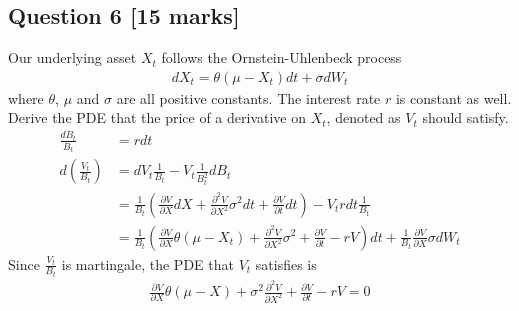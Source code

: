\documentclass[11pt,a4paper,hidelinks,fleqn]{article}            %
\begin{document}
\subsection*{Question 6 [15 marks]}
Our underlying asset $X_t$ follows the Ornstein-Uhlenbeck process
\begin{align*}
d X_t = \theta(\mu - X_t) dt + \sigma dW_t
\end{align*}
where $\theta$, $\mu$ and $\sigma$ are all positive constants. The interest rate $r$ is constant as well.
Derive the PDE that the price of a derivative on $X_t$, denoted as $V_t$ should satisfy. 
\begin{align*}
\frac{dB_t}{B_t} & = rdt \\
d{\left(\frac{V_t}{B_t}\right)} & = d{V_t} \frac{1}{B_t} - V_t \frac{1}{B_t^2} dB_t \\
 & = \frac{1}{B_t} (\frac{\partial V}{\partial X} dX + \frac{\partial^2 V}{\partial X^2} \sigma^2 dt + \frac{\partial V}{\partial t} dt) - V_t r dt \frac{1}{B_t} \\
 & = \frac{1}{B_t} (\frac{\partial V}{\partial X} \theta (\mu - X_t) + \frac{\partial^2 V}{\partial X^2} \sigma^2 + \frac{\partial V}{\partial t}  - rV) dt + \frac{1}{B_t} \frac{\partial V}{\partial X} \sigma dW_t
\end{align*}
Since $\frac{V_t}{B_t}$ is martingale, the PDE that $V_t$ satisfies is
\begin{align*}
\frac{\partial V}{\partial X} \theta (\mu - X) + \sigma^2 \frac{\partial^2 V}{\partial X^2} + \frac{\partial V}{\partial t}  - rV = 0
\end{align*}
\end{document}
